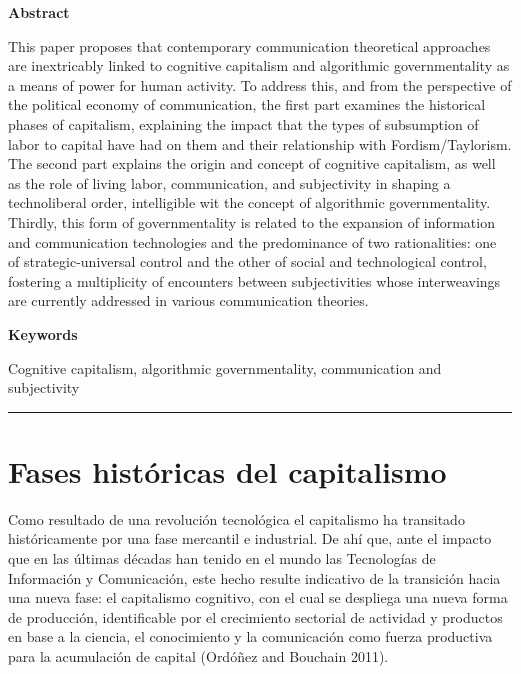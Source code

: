 \documentclass[
]{interact}
\begin{document}
\begin{footnotesize}
\textbf{Abstract}

This paper proposes that contemporary communication theoretical approaches are inextricably linked to cognitive capitalism and algorithmic governmentality as a means of power for human activity. To address this, and from the perspective of the political economy of communication, the first part examines the historical phases of capitalism, explaining the impact that the types of subsumption of labor to capital have had on them and their relationship with Fordism/Taylorism. The second part explains the origin and concept of cognitive capitalism, as well as the role of living labor, communication, and subjectivity in shaping a technoliberal order, intelligible wit the concept of algorithmic governmentality. Thirdly, this form of governmentality is related to the expansion of information and communication technologies and the predominance of two rationalities: one of strategic-universal control and the other of social and technological control, fostering a multiplicity of encounters between subjectivities whose interweavings are currently addressed in various communication theories.

\textbf{Keywords}

Cognitive capitalism, algorithmic governmentality, communication and subjectivity
\end{footnotesize}

\begin{center}\rule{0.5\linewidth}{0.5pt}\end{center}

\section{Fases históricas del
capitalismo}\label{fases-histuxf3ricas-del-capitalismo}

Como resultado de una revolución tecnológica el capitalismo ha
transitado históricamente por una fase mercantil e industrial. De ahí
que, ante el impacto que en las últimas décadas han tenido en el mundo
las Tecnologías de Información y Comunicación, este hecho resulte
indicativo de la transición hacia una nueva fase: el capitalismo
cognitivo, con el cual se despliega una nueva forma de producción,
identificable por el crecimiento sectorial de actividad y productos en
base a la ciencia, el conocimiento y la comunicación como fuerza
productiva para la acumulación de capital (Ordóñez and Bouchain 2011).
\end{document}

